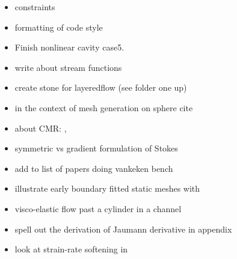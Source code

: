 \begin{itemize}
\begin{itemize}
\item constraints \cite{absh79}
\item formatting of code style
\item Finish nonlinear cavity case5.
\item write about stream functions 
\item create stone for layeredflow (see folder one up)
\item in the context of mesh generation on sphere cite \cite{moma19}
\item about CMR: \cite{vaks15},\cite{kott05}
\item symmetric vs gradient formulation of Stokes
\item add \cite{devv00a,dadh07} to list of papers doing vankeken bench
\item illustrate early boundary fitted static meshes with \cite{thar85,boww89,whbw92}
\item visco-elastic flow past a cylinder in a channel \cite{bepo10}
\item \cite{bepo10} spell out the derivation of Jaumann derivative in appendix
\item look at strain-rate softening in \cite{belz02}
\end{itemize}



\end{itemize}
